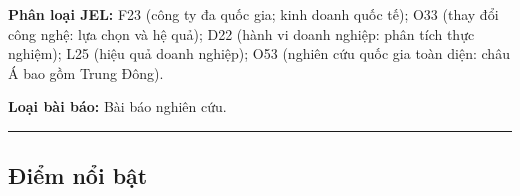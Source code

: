 \documentclass[12pt,a4paper]{article}
\begin{document}
\textbf{Phân loại JEL:} F23 (công ty đa quốc gia; kinh doanh quốc tế);
O33 (thay đổi công nghệ: lựa chọn và hệ quả); D22 (hành vi doanh nghiệp:
phân tích thực nghiệm); L25 (hiệu quả doanh nghiệp); O53 (nghiên cứu
quốc gia toàn diện: châu Á bao gồm Trung Đông).

\textbf{Loại bài báo:} Bài báo nghiên cứu.

\begin{center}\rule{0.5\linewidth}{0.5pt}\end{center}

\hypertarget{ux111iux1ec3m-nux1ed5i-bux1eadt}{%
\subsection{Điểm nổi bật}\label{ux111iux1ec3m-nux1ed5i-bux1eadt}}
\end{document}
